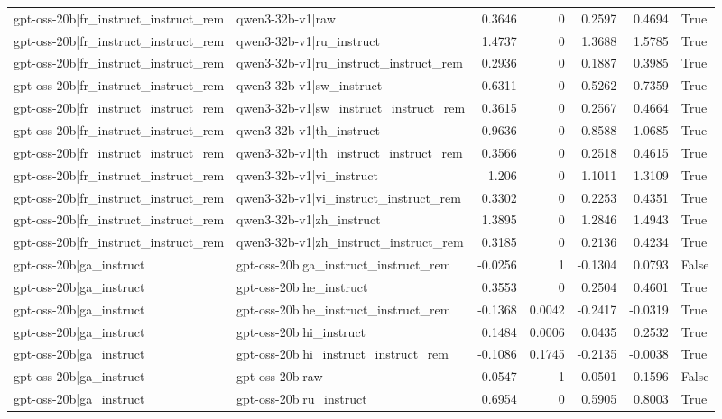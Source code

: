 \begin{table}
\begin{tabular}{l l r r r r l}
gpt-oss-20b|fr_instruct_instruct_rem & qwen3-32b-v1|raw & 0.3646 & 0 & 0.2597 & 0.4694 & True \\
gpt-oss-20b|fr_instruct_instruct_rem & qwen3-32b-v1|ru_instruct & 1.4737 & 0 & 1.3688 & 1.5785 & True \\
gpt-oss-20b|fr_instruct_instruct_rem & qwen3-32b-v1|ru_instruct_instruct_rem & 0.2936 & 0 & 0.1887 & 0.3985 & True \\
gpt-oss-20b|fr_instruct_instruct_rem & qwen3-32b-v1|sw_instruct & 0.6311 & 0 & 0.5262 & 0.7359 & True \\
gpt-oss-20b|fr_instruct_instruct_rem & qwen3-32b-v1|sw_instruct_instruct_rem & 0.3615 & 0 & 0.2567 & 0.4664 & True \\
gpt-oss-20b|fr_instruct_instruct_rem & qwen3-32b-v1|th_instruct & 0.9636 & 0 & 0.8588 & 1.0685 & True \\
gpt-oss-20b|fr_instruct_instruct_rem & qwen3-32b-v1|th_instruct_instruct_rem & 0.3566 & 0 & 0.2518 & 0.4615 & True \\
gpt-oss-20b|fr_instruct_instruct_rem & qwen3-32b-v1|vi_instruct & 1.206 & 0 & 1.1011 & 1.3109 & True \\
gpt-oss-20b|fr_instruct_instruct_rem & qwen3-32b-v1|vi_instruct_instruct_rem & 0.3302 & 0 & 0.2253 & 0.4351 & True \\
gpt-oss-20b|fr_instruct_instruct_rem & qwen3-32b-v1|zh_instruct & 1.3895 & 0 & 1.2846 & 1.4943 & True \\
gpt-oss-20b|fr_instruct_instruct_rem & qwen3-32b-v1|zh_instruct_instruct_rem & 0.3185 & 0 & 0.2136 & 0.4234 & True \\
gpt-oss-20b|ga_instruct & gpt-oss-20b|ga_instruct_instruct_rem & -0.0256 & 1 & -0.1304 & 0.0793 & False \\
gpt-oss-20b|ga_instruct & gpt-oss-20b|he_instruct & 0.3553 & 0 & 0.2504 & 0.4601 & True \\
gpt-oss-20b|ga_instruct & gpt-oss-20b|he_instruct_instruct_rem & -0.1368 & 0.0042 & -0.2417 & -0.0319 & True \\
gpt-oss-20b|ga_instruct & gpt-oss-20b|hi_instruct & 0.1484 & 0.0006 & 0.0435 & 0.2532 & True \\
gpt-oss-20b|ga_instruct & gpt-oss-20b|hi_instruct_instruct_rem & -0.1086 & 0.1745 & -0.2135 & -0.0038 & True \\
gpt-oss-20b|ga_instruct & gpt-oss-20b|raw & 0.0547 & 1 & -0.0501 & 0.1596 & False \\
gpt-oss-20b|ga_instruct & gpt-oss-20b|ru_instruct & 0.6954 & 0 & 0.5905 & 0.8003 & True \\

\end{tabular}
\end{table}
